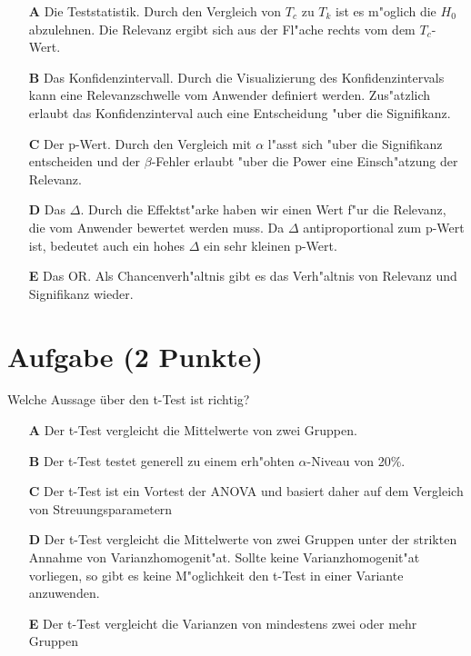 \documentclass[a4paper, 10pt]{scrartcl}\usepackage[]{graphicx}\usepackage[]{xcolor}
\begin{document}
\begin{enumerate}
\item [\textbf{A} \msquare] Die Teststatistik. Durch den Vergleich von $T_c$ zu $T_k$ ist es m{"o}glich die $H_0$ abzulehnen. Die Relevanz ergibt sich aus der Fl{"a}che rechts vom dem $T_c$-Wert.
\item [\textbf{B} \msquare] Das Konfidenzintervall. Durch die Visualizierung des Konfidenzintervals kann eine Relevanzschwelle vom Anwender definiert werden. Zus{"a}tzlich erlaubt das Konfidenzinterval auch eine Entscheidung {"u}ber die Signifikanz.
\item [\textbf{C} \msquare] Der p-Wert. Durch den Vergleich mit $\alpha$ l{"a}sst sich {"u}ber die Signifikanz entscheiden und der $\beta$-Fehler erlaubt {"u}ber die Power eine Einsch{"a}tzung der Relevanz.
\item [\textbf{D} \msquare] Das $\Delta$. Durch die Effektst{"a}rke haben wir einen Wert f{"u}r die Relevanz, die vom Anwender bewertet werden muss. Da $\Delta$ antiproportional zum p-Wert ist, bedeutet auch ein hohes $\Delta$ ein sehr kleinen p-Wert.
\item [\textbf{E} \msquare] Das OR. Als Chancenverh{"a}ltnis gibt es das Verh{"a}ltnis von Relevanz und Signifikanz wieder.
\end{enumerate}

\section{Aufgabe \hfill (2 Punkte)}

Welche Aussage {\"u}ber den t-Test ist richtig?



\begin{enumerate}
\item [\textbf{A} \msquare] Der t-Test vergleicht die Mittelwerte von zwei Gruppen.
\item [\textbf{B} \msquare] Der t-Test testet generell zu einem erh{"o}hten $\alpha$-Niveau von 20\%.
\item [\textbf{C} \msquare] Der t-Test ist ein Vortest der ANOVA und basiert daher auf dem Vergleich von Streuungsparametern
\item [\textbf{D} \msquare] Der t-Test vergleicht die Mittelwerte von zwei Gruppen unter der strikten Annahme von Varianzhomogenit{"a}t. Sollte keine Varianzhomogenit{"a}t vorliegen, so gibt es keine M{"o}glichkeit den t-Test in einer Variante anzuwenden.
\item [\textbf{E} \msquare] Der t-Test vergleicht die Varianzen von mindestens zwei oder mehr Gruppen
\end{enumerate}
\end{document}

